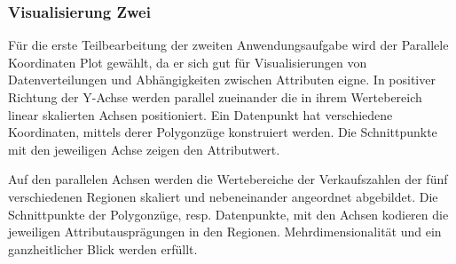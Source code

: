 \documentclass[usegeometry=true]{scrartcl}
\begin{document}

\subsubsection{Visualisierung Zwei}
Für die erste Teilbearbeitung der zweiten Anwendungsaufgabe wird der Parallele Koordinaten Plot gewählt, da er sich gut für Visualisierungen von Datenverteilungen und Abhängigkeiten zwischen Attributen eigne.%
In positiver Richtung der Y-Achse werden parallel zueinander die in ihrem Wertebereich linear skalierten Achsen positioniert.
Ein Datenpunkt hat verschiedene Koordinaten, mittels derer Polygonzüge konstruiert werden.
Die Schnittpunkte mit den jeweiligen Achse zeigen den Attributwert.%

Auf den parallelen Achsen werden die Wertebereiche der Verkaufszahlen der fünf verschiedenen Regionen skaliert und nebeneinander angeordnet abgebildet.
Die Schnittpunkte der Polygonzüge, resp. Datenpunkte, mit den Achsen kodieren die jeweiligen Attributausprägungen in den Regionen.
Mehrdimensionalität und ein ganzheitlicher Blick werden erfüllt.
\end{document}

